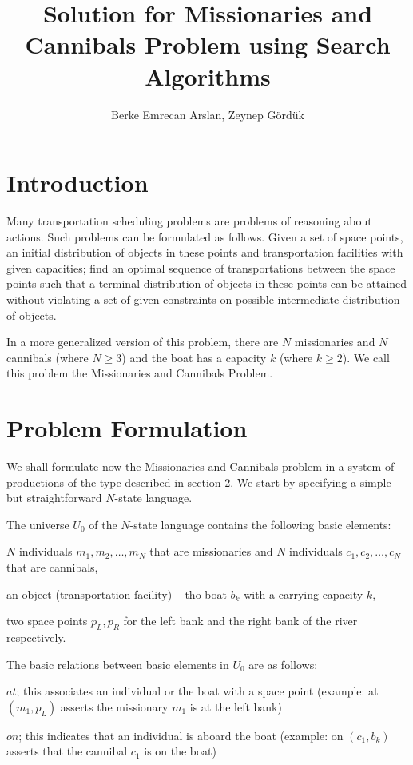 \documentclass[]{report}
\title{Solution for Missionaries and Cannibals Problem using Search Algorithms}
\author{Berke Emrecan Arslan, Zeynep Gördük}
\begin{document}
\maketitle

\begin{abstract}
\end{abstract}

\section{Introduction}
Many transportation scheduling problems are problems of reasoning about actions. Such problems can be formulated as follows. Given a set of space points, an initial distribution of objects in these points and transportation facilities with given capacities; find an optimal sequence of transportations between the space points such that a terminal distribution of objects in these points can be attained without violating a set of given constraints on possible intermediate distribution of objects.

In a more generalized version of this problem, there are $N$ missionaries and $N$ cannibals (where $N \geq 3$) and the boat has a capacity $k$ (where $k \geq 2$). We call this problem the Missionaries and Cannibals Problem.

\section{Problem Formulation}
We shall formulate now the Missionaries and Cannibals problem in a system of productions of the type described in section 2. We start by specifying a simple but straightforward $N$-state language.

The universe $U_0$ of the $N$-state language contains the following basic elements:
\begin{list}{--}{}
	\item $N$ individuals $m_1,m_2,\dots,m_N$ that are missionaries and $N$ individuals $c_1,c_2,\dots,c_N$ that are cannibals,
	\item an object (transportation facility) -- tho boat $b_k$ with a carrying capacity $k$,
	\item two space points $p_L,p_R$ for the left bank and the right bank of the river respectively.
\end{list}

The basic relations between basic elements in $U_0$ are as follows:
\begin{list}{}{}
	\item $at$; this associates an individual or the boat with a space point (example: at $(m_1,p_L)$ asserts the missionary $m_1$ is at the left bank)
	\item $on$; this indicates that an individual is aboard the boat (example: on $(c_1,b_k)$ asserts that the cannibal $c_1$ is on the boat)
\end{list}
\end{document}
